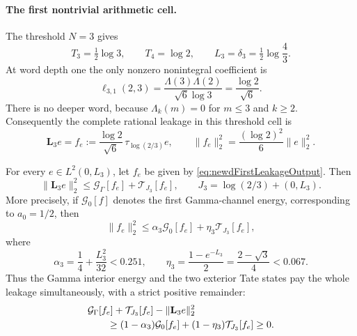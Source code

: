 \paragraph{The first nontrivial arithmetic cell.}
The threshold $N=3$ gives
\begin{equation}\label{eq:newdFirstCellLength}
 T_3=\tfrac12\log3,
 \qquad T_4=\log2,
 \qquad L_3=\delta_3=\tfrac12\log\frac43.
\end{equation}
At word depth one the only nonzero nonintegral coefficient is
\begin{equation}\label{eq:newdFirstLeakageCoefficient}
 \ell_{3,1}(2,3)
 =\frac{\Lambda(3)\Lambda(2)}{\sqrt6\log3}
 =\frac{\log2}{\sqrt6}.
\end{equation}
There is no deeper word, because $\Lambda_k(m)=0$ for $m\leq3$ and
$k\geq2$.  Consequently the complete rational leakage in this threshold
cell is
\begin{equation}\label{eq:newdFirstLeakageOutput}
 \mathbf L_3e=f_e
 :=\frac{\log2}{\sqrt6}\,
   \tau_{\log(2/3)}e,
 \qquad
 \|f_e\|_2^2=\frac{(\log2)^2}{6}\|e\|_2^2.
\end{equation}

\begin{theorem}
\label{thm:newdFirstCellPayment}
For every $e\in L^2(0,L_3)$, let $f_e$ be given by
\eqref{eq:newdFirstLeakageOutput}.  Then
\begin{equation}\label{eq:newdFirstCellPayment}
 \|\mathbf L_3e\|_2^2
 \leq \mathcal G_\Gamma[f_e]+\mathcal T_{J_3}[f_e],
 \qquad
 J_3=\log(2/3)+(0,L_3).
\end{equation}
More precisely, if $\mathcal G_{0}[f]$ denotes the first Gamma-channel
energy, corresponding to $a_0=1/2$, then
\begin{equation}\label{eq:newdFirstCellStrictPayment}
 \|f_e\|_2^2
 \leq \alpha_3\mathcal G_0[f_e]
       +\eta_3\mathcal T_{J_3}[f_e],
\end{equation}
where
\begin{equation}\label{eq:newdFirstCellConstants}
 \alpha_3=\frac14+\frac{L_3^2}{32}<0.251,
 \qquad
 \eta_3=\frac{1-e^{-L_3}}2
       =\frac{2-\sqrt3}{4}<0.067.
\end{equation}
Thus the Gamma interior energy and the two exterior Tate states pay the
whole leakage simultaneously, with a strict positive remainder:
\begin{align}
 &\mathcal G_\Gamma[f_e]+\mathcal T_{J_3}[f_e]
       -\|\mathbf L_3e\|_2^2                              \notag\\
 &\qquad\geq
 (1-\alpha_3)\mathcal G_0[f_e]
 +(1-\eta_3)\mathcal T_{J_3}[f_e]\geq0.
 \label{eq:newdFirstCellRemainder}
\end{align}
\end{theorem}

